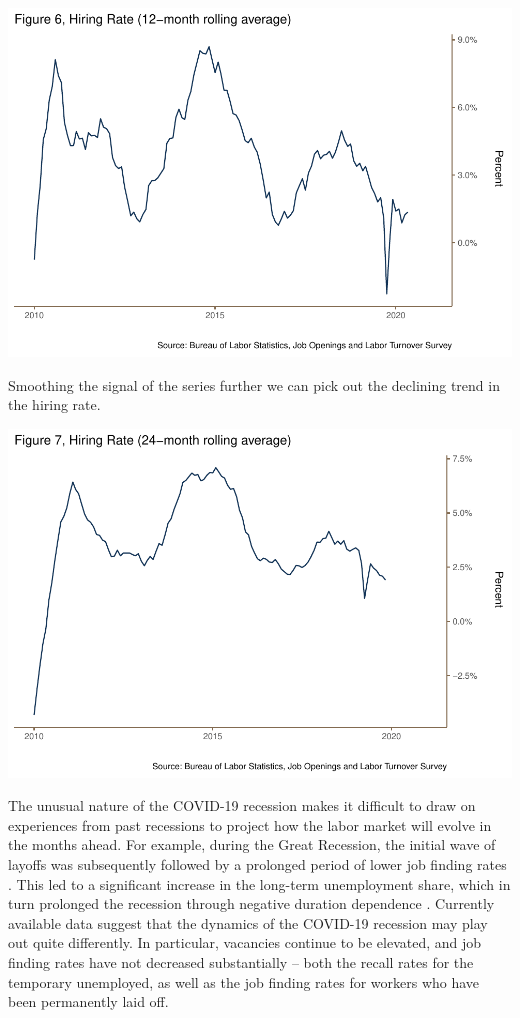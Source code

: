\documentclass[
  11pt,
]{article}
\begin{document}
\begin{center}\includegraphics{JOLTS_files/figure-latex/unnamed-chunk-14-1} \end{center}

Smoothing the signal of the series further we can pick out the declining
trend in the hiring rate.

\begin{center}\includegraphics{JOLTS_files/figure-latex/unnamed-chunk-15-1} \end{center}

The unusual nature of the COVID-19 recession makes it difficult to draw
on experiences from past recessions to project how the labor market will
evolve in the months ahead. For example, during the Great Recession, the
initial wave of layoffs was subsequently followed by a prolonged period
of lower job finding rates \citep{elsby09}. This led to a significant
increase in the long-term unemployment share, which in turn prolonged
the recession through negative duration dependence \citep{krueger14}.
Currently available data suggest that the dynamics of the COVID-19
recession may play out quite differently. In particular, vacancies
continue to be elevated, and job finding rates have not decreased
substantially -- both the recall rates for the temporary unemployed, as
well as the job finding rates for workers who have been permanently laid
off.
\end{document}
